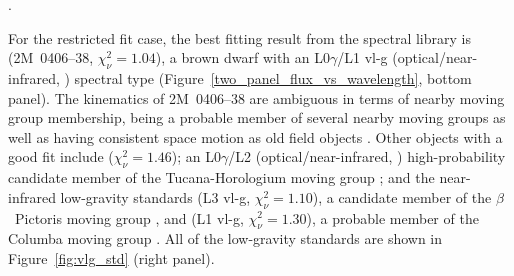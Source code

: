 \documentclass[twocolumn]{aastex6}
\begin{document}
\begin{figure*}
\caption{The spectrum of $\beta$~Pic~b (black points) fit to the L-dwarf near-infrared low-gravity standards from \citet{Allers2013} (solid curves) using the unrestricted fit described in Section~\ref{sec:unrestricted} (left panel) and the restricted fit described in Section~\ref{sec:restricted} (right panel). The spectrum of each standard is normalized to the flux at 1.65\,\micron, and then offset for clarity}.
\label{fig:vlg_std}
\end{figure*}

For the restricted fit case, the best fitting result from the spectral library is  (2M~0406--38, $\chi^2_{\nu}=1.04$), a brown dwarf with an L0$\gamma$/L1 {\sc vl-g} (optical/near-infrared, \citealp{Faherty:2013bc, Allers2013}) spectral type (Figure~\ref{two_panel_flux_vs_wavelength}, bottom panel). The kinematics of 2M~0406--38 are ambiguous in terms of nearby moving group membership, being a probable member of several nearby moving groups as well as having consistent space motion as old field objects \citep{Faherty:2016fx}. Other objects with a good fit include  ($\chi^2_{\nu} = 1.46$); an L0$\gamma$/L2 (optical/near-infrared, \citealp{2009AJ....137.3345C, 2014AJ....147...34S}) high-probability candidate member of the Tucana-Horologium moving group \citep{Gagne:2014gp}; and the \citet{Allers2013} near-infrared low-gravity standards  (L3 {\sc vl-g}, $\chi^2_{\nu} = 1.10$), a candidate member of the $\beta$~Pictoris moving group \citep{Liu:2016co}, and  (L1 {\sc vl-g}, $\chi^2_{\nu} = 1.30$), a probable member of the Columba moving group \citep{Liu:2016co}. All of the \citet{Allers2013} low-gravity standards are shown in Figure~\ref{fig:vlg_std} (right panel).
\end{document}
